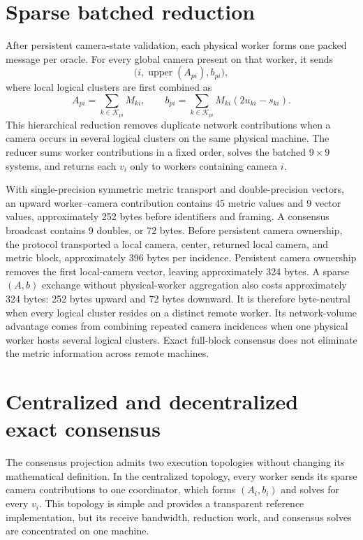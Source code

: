 \section{Sparse batched reduction}

After persistent camera-state validation, each physical worker forms one packed
message per oracle.  For every global camera present on that worker, it sends
\begin{equation}
  \bigl(i,\operatorname{upper}(A_{pi}),b_{pi}\bigr),
\end{equation}
where local logical clusters are first combined as
\begin{equation}
  A_{pi}=\sum_{k\in\mathcal K_{pi}}M_{ki},
  \qquad
  b_{pi}=\sum_{k\in\mathcal K_{pi}}M_{ki}(2u_{ki}-s_{ki}).
\end{equation}
This hierarchical reduction removes duplicate network contributions when a
camera occurs in several logical clusters on the same physical machine.  The
reducer sums worker contributions in a fixed order, solves the batched
$9\times9$ systems, and returns each $v_i$ only to workers containing camera
$i$.

With single-precision symmetric metric transport and double-precision vectors,
an upward worker--camera contribution contains 45 metric values and 9 vector
values, approximately 252 bytes before identifiers and framing.  A consensus
broadcast contains 9 doubles, or 72 bytes.  Before persistent camera ownership,
the protocol transported a local camera, center, returned local camera, and
metric block, approximately 396 bytes per incidence.  Persistent camera
ownership removes the first local-camera vector, leaving approximately 324
bytes.  A sparse $(A,b)$ exchange without physical-worker aggregation also
costs approximately 324 bytes: 252 bytes upward and 72 bytes downward.  It is
therefore byte-neutral when every logical cluster resides on a distinct remote
worker.  Its network-volume advantage comes from combining repeated camera
incidences when one physical worker hosts several logical clusters.  Exact
full-block consensus does not eliminate the metric information across remote
machines.

\section{Centralized and decentralized exact consensus}

The consensus projection admits two execution topologies without changing its
mathematical definition.  In the centralized topology, every worker sends its
sparse camera contributions to one coordinator, which forms $(A_i,b_i)$ and
solves for every $v_i$.  This topology is simple and provides a transparent
reference implementation, but its receive bandwidth, reduction work, and
consensus solves are concentrated on one machine.

